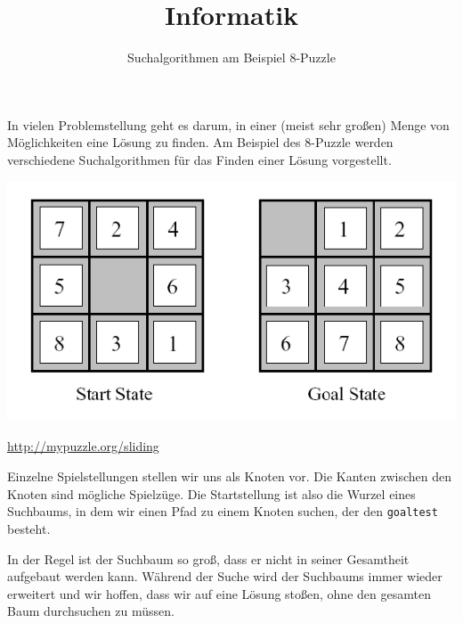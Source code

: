 \usepackage[ngerman]{babel}
\usepackage[utf8]{inputenc}
\usepackage{amsmath}
\usepackage{amssymb}
\usepackage{listings} 
\usepackage{stmaryrd}
\lstset{language=Python, tabsize=4, showstringspaces=false,basicstyle=\scriptsize,mathescape=true}  
\usepackage{mathtools}
\usepackage{ulem}
\usepackage{tikz}

\parskip 10pt




\title{Informatik}   
\author{Suchalgorithmen am Beispiel 8-Puzzle} 
\date{}
\frame{\titlepage} 

\begin{frame}[fragile]

In vielen Problemstellung geht es darum, in einer (meist sehr großen) Menge von Möglichkeiten eine Lösung zu finden. 
Am Beispiel des 8-Puzzle werden verschiedene Suchalgorithmen für das Finden einer Lösung vorgestellt.


\includegraphics[scale=0.6]{bild1.png}

\url{http://mypuzzle.org/sliding}

\end{frame}

\begin{frame}[fragile]
Einzelne Spielstellungen stellen wir uns als Knoten vor. Die Kanten zwischen den Knoten sind mögliche Spielzüge.
Die Startstellung ist also die Wurzel eines Suchbaums, in dem wir einen Pfad zu einem Knoten suchen, der den \texttt{goaltest} besteht. 

In der Regel ist der Suchbaum so groß, dass er nicht in seiner Gesamtheit aufgebaut werden kann. Während der Suche wird der Suchbaums immer wieder erweitert und wir hoffen, dass wir auf eine Lösung stoßen, ohne den gesamten Baum durchsuchen zu müssen.
\end{frame}

